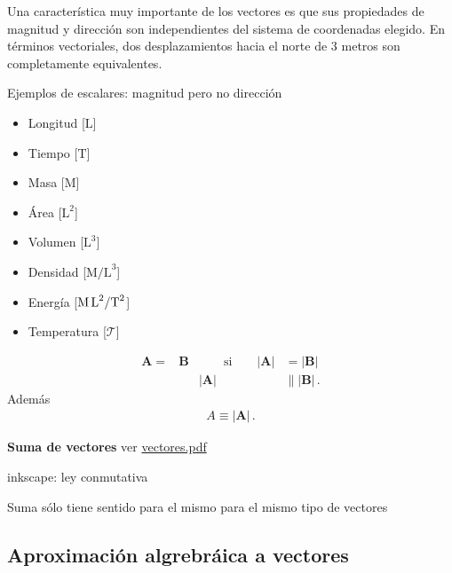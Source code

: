 Una característica muy importante de los vectores es que sus propiedades de magnitud y dirección son independientes del sistema de coordenadas elegido. En términos vectoriales, dos desplazamientos hacia el norte de 3 metros son completamente equivalentes. 



Ejemplos de escalares: magnitud pero no dirección
\begin{itemize}
\item Longitud [$\text{L}$]
\item Tiempo [$\text{T}$]
\item Masa [$\text{M}$]
\item Área [$\text{L}^2$]
\item Volumen [$\text{L}^3$]
\item Densidad [$\text{M/L}^3$]
\item Energía [$\text{M\,L}^2/\text{T}^2$]
\item Temperatura [$\mathcal{T}$]
\end{itemize}

\begin{align*}
  \mathbf{A}=&\mathbf{B} &\qquad \text{si}\qquad |\mathbf{A}|&=|\mathbf{B}|\nonumber\\
  &&|\mathbf{A}|&\parallel|\mathbf{B}|\,.
\end{align*}
Adem\'as
\begin{align}
  A\equiv|\mathbf{A}|\,.
\end{align}

\textbf{Suma de vectores}
ver \href{https://docs.google.com/viewer?a=v&pid=sites&srcid=ZmlzaWNhLnVkZWEuZWR1LmNvfG1lY2FuaWNhfGd4OjdmNWMyZTc5NDIxNTAxNjg}{vectores.pdf}
\begin{inprogress}
  inkscape: ley conmutativa
\end{inprogress}
Suma s\'olo tiene sentido para el mismo para el mismo tipo de vectores


\subsection{Aproximaci\'on algrebr\'aica  a vectores}

